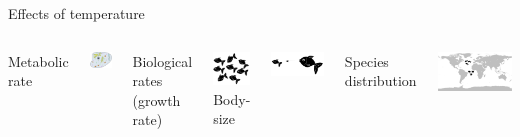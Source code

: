 \documentclass[11pt, compress, aspectratio=1610]{beamer}
\newcommand{\begincols}{\begin{columns}}
\newcommand{\stopcols}{\end{columns}}
\begin{document}
\begin{frame}{Effects of temperature}

\begincols
  \centering
 Metabolic rate \par
 \includegraphics[width=0.4\linewidth]{figuresAz/cell.png}\par
 \vspace{1cm} \pause
 Biological rates (growth rate) \par
 \includegraphics[width=0.5\linewidth]{figuresAz/fish_pop.pdf} \pause
 \hfill{} \centering
 Body-size \par
 \includegraphics[width=0.6\linewidth]{figuresAz/size.pdf}\par
 \vspace{1cm} \pause
 Species distribution \par
 \includegraphics[width=0.8\linewidth]{figuresAz/world.pdf} \par

\stopcols

\end{frame}
\end{document}
